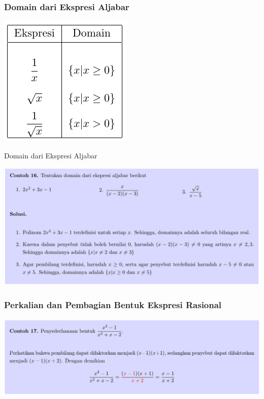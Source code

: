 \documentclass[pdflatex,compress,mathserif]{beamer}
\begin{document}
\begin{frame}
	\frametitle{Domain dari Ekspresi Aljabar}
	\begin{center}
		\includegraphics[width=0.5\linewidth]{img/img32}
	\end{center}
\end{frame}

\begin{frame}{Domain dari Ekspresi Aljabar}
	\begin{center}
		\includegraphics[width=\linewidth]{img/img33}
	\end{center}
\end{frame}

\begin{frame}
	\frametitle{Perkalian dan Pembagian Bentuk Ekspresi Rasional}
	\begin{center}
		\includegraphics[width=\linewidth]{img/img34}
	\end{center}
\end{frame}
\end{document}
